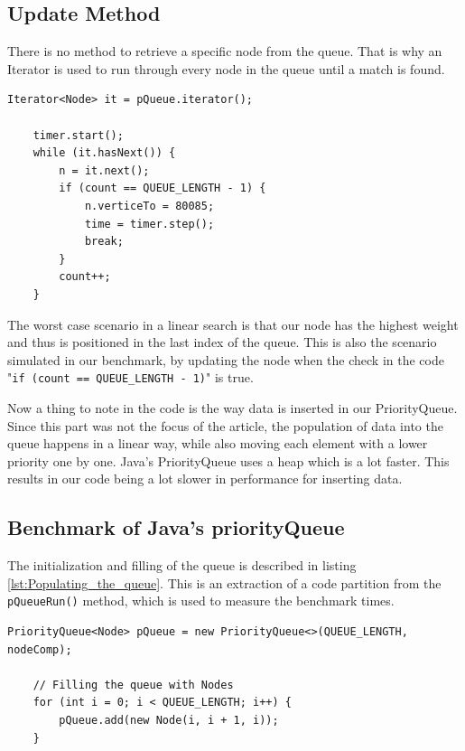 \documentclass{article}
\begin{document}
\subsection{Update Method} %
There is no method to retrieve a specific node from the queue.
That is why an Iterator is used to run through every node in the queue until a match is found.

\begin{lstlisting}[caption={Finding the node},label={lst:Finding_the_node}]
    Iterator<Node> it = pQueue.iterator();

    timer.start();
    while (it.hasNext()) {
        n = it.next();
        if (count == QUEUE_LENGTH - 1) {
            n.verticeTo = 80085;
            time = timer.step();
            break;
        }
        count++;
    }
\end{lstlisting}

The worst case scenario in a linear search is that our node has the highest 
weight and thus is positioned in the last index of the queue. 
This is also the scenario simulated in our benchmark, by updating the node 
when the check in the code "\lstinline{if (count == QUEUE_LENGTH - 1)}" is true.

Now a thing to note in the code is the way data is inserted in our PriorityQueue. 
Since this part was not the focus of the article, the population of data into the 
queue happens in a linear way, while also moving each element with a lower priority 
one by one. 
Java’s PriorityQueue uses a heap which is a lot faster. This results in our code being 
a lot slower in performance for inserting data.


\subsection{Benchmark of Java's priorityQueue} %
\label{sec:javabenchmark}
The initialization and filling of the queue is described in listing \ref{lst:Populating_the_queue}. 
This is an extraction of a code partition from the \lstinline{pQueueRun()} method, 
which is used to measure the benchmark times.

\begin{lstlisting}[caption={Populating the queue},label={lst:Populating_the_queue}]
    PriorityQueue<Node> pQueue = new PriorityQueue<>(QUEUE_LENGTH, nodeComp);

    // Filling the queue with Nodes
    for (int i = 0; i < QUEUE_LENGTH; i++) {
        pQueue.add(new Node(i, i + 1, i));
    }
\end{lstlisting}
\end{document}
